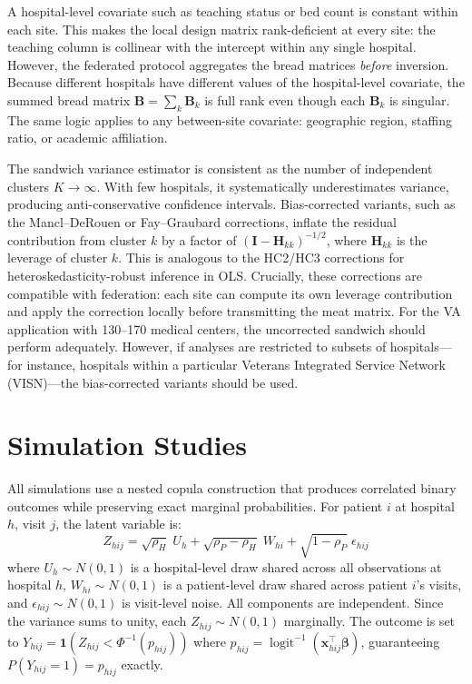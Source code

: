\documentclass[useAMS,referee]{biom}
\DeclareMathOperator{\logit}{logit}
\begin{document}
\begin{remark}
    A hospital-level covariate such as teaching status or bed count is constant within each site. This makes the local design matrix rank-deficient at every site: the teaching column is collinear with the intercept within any single hospital. However, the federated protocol aggregates the bread matrices \emph{before} inversion. Because different hospitals have different values of the hospital-level covariate, the summed bread matrix $\mathbf{B} = \sum_k \mathbf{B}_k$ is full rank even though each $\mathbf{B}_k$ is singular. The same logic applies to any between-site covariate: geographic region, staffing ratio, or academic affiliation.
\end{remark}

\begin{remark}
The sandwich variance estimator is consistent as the number of independent clusters $K \to \infty$. With few hospitals, it systematically underestimates variance, producing anti-conservative confidence intervals. Bias-corrected variants, such as the Mancl--DeRouen \cite{mancl2001covariance} or Fay--Graubard \cite{fay2001small} corrections, inflate the residual contribution from cluster $k$ by a factor of $(\mathbf{I} - \mathbf{H}_{kk})^{-1/2}$, where $\mathbf{H}_{kk}$ is the leverage of cluster $k$. This is analogous to the HC2/HC3 corrections for heteroskedasticity-robust inference in OLS. Crucially, these corrections are compatible with federation: each site can compute its own leverage contribution and apply the correction locally before transmitting the meat matrix. For the VA application with 130--170 medical centers, the uncorrected sandwich should perform adequately. However, if analyses are restricted to subsets of hospitals---for instance, hospitals within a particular Veterans Integrated Service Network (VISN)---the bias-corrected variants should be used.
\end{remark}

\section{Simulation Studies}
\label{s:simulations}

All simulations use a nested copula construction that produces correlated binary outcomes while preserving exact marginal probabilities. For patient $i$ at hospital $h$, visit $j$, the latent variable is:
\begin{equation}
Z_{hij} = \sqrt{\rho_H}\; U_h + \sqrt{\rho_P - \rho_H}\; W_{hi} + \sqrt{1 - \rho_P}\; \epsilon_{hij}
\label{eq:copula}
\end{equation}
where $U_h \sim N(0,1)$ is a hospital-level draw shared across all observations at hospital $h$, $W_{hi} \sim N(0,1)$ is a patient-level draw shared across patient $i$'s visits, and $\epsilon_{hij} \sim N(0,1)$ is visit-level noise. All components are independent. Since the variance sums to unity, each $Z_{hij} \sim N(0,1)$ marginally. The outcome is set to $Y_{hij} = \mathbf{1}(Z_{hij} < \Phi^{-1}(p_{hij}))$ where $p_{hij} = \logit^{-1}(\mathbf{x}_{hij}^{\top} \boldsymbol{\beta})$, guaranteeing $P(Y_{hij} = 1) = p_{hij}$ exactly.
\end{document}

